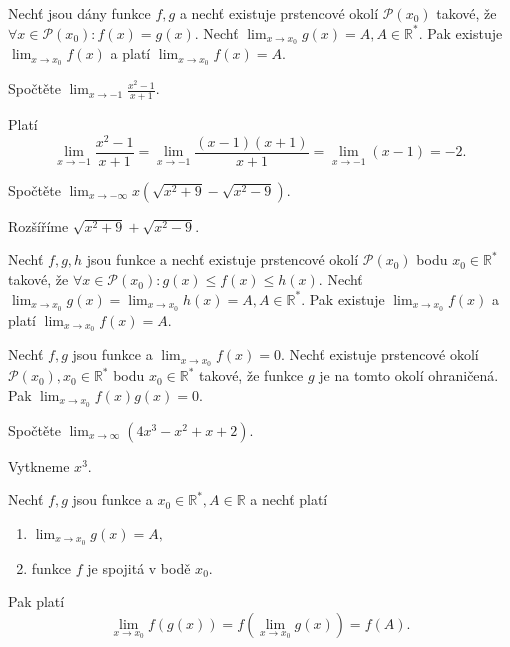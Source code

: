 \begin{veta}
Nechť jsou dány funkce $f,g$ a nechť existuje prstencové okolí
$\mathscr P(x_0)$ takové, že $\forall x \in \mathscr P(x_0):f(x)=g(x).$
Nechť $\lim_{x\to x_0}g(x)=A, A\in \mathbb R^*.$ Pak existuje $\lim_{x\to x_0}f(x)$
a platí $\lim_{x\to x_0}f(x)=A.$
\end{veta}

\begin{priklad}
Spočtěte $\lim_{x\to -1}\frac{x^2-1}{x+1}$.
\end{priklad}

\begin{reseni}
 Platí
 $$\lim_{x\to -1}\frac{x^2-1}{x+1}=\lim_{x\to -1}\frac{(x-1)(x+1)}{x+1}=\lim_{x\to -1}(x-1)=-2.$$
\end{reseni}

\begin{priklad}
Spočtěte $\lim_{x\to-\infty}x(\sqrt{x^2+9}-\sqrt{x^2-9})$.
\end{priklad}

\begin{reseni}
Rozšíříme $\sqrt{x^2+9}+\sqrt{x^2-9}.  $
\end{reseni}

\begin{veta}
Nechť $f,g,h$ jsou funkce a nechť existuje prstencové okolí $\mathscr P(x_0)$
bodu $x_0\in \mathbb R^*$ takové, že $\forall x \in \mathscr P(x_0):g(x)\leq f(x)\leq h(x).$
Nechť $\lim_{x\to x_0}g(x)=\lim_{x\to x_0}h(x)=A, A \in \mathbb R^*.$ Pak existuje
$\lim_{x\to x_0}f(x)$ a  platí $ \lim_{x\to x_0}f(x) = A.$
\end{veta}

\begin{veta}
Nechť $f,g$ jsou funkce a $\lim_{x\to x_0}f(x)=0.$ Nechť existuje prstencové
okolí $\mathscr P(x_0), x_0\in \mathbb R^*$ bodu $x_0\in \mathbb R^*$ takové, že
funkce $g$ je na tomto okolí ohraničená. Pak $\lim_{x\to x_0}f(x)g(x)=0.$
\end{veta}

\begin{priklad}
Spočtěte $\lim_{x\to \infty}\left ( 4x^3-x^2+x+2 \right ) .$
\end{priklad}

\begin{reseni}
Vytkneme $x^3$.
\end{reseni}

\begin{veta}\label{slozf}
Nechť $f,g$ jsou funkce a $x_0\in \mathbb R^*, A \in \mathbb R$ a nechť platí
\begin{enumerate}[$i.$]
\item $\lim_{x\to x_0}g(x)=A,$
\item funkce $f$ je spojitá v bodě $x_0.$
\end{enumerate}
Pak platí
$$\lim_{x\to x_0}f \left ( g(x) \right ) =f \left ( \lim_{x\to x_0}g(x) \right ) =f(A).$$
\end{veta}


